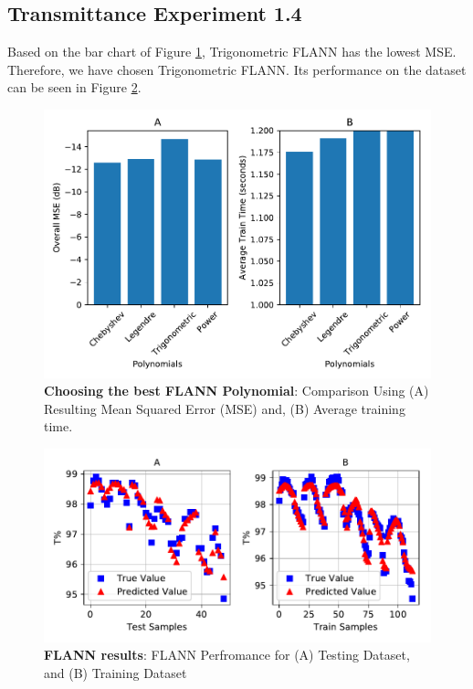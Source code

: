 \documentclass[]{article}
\begin{document}
\newpage

\hypertarget{transmittance-experiment-1.4}{%
\subsection{Transmittance Experiment 1.4}\label{transmittance-experiment-1.4}}

Based on the bar chart of Figure \ref{fig:transflannbar2}, Trigonometric FLANN has the lowest MSE. Therefore, we have chosen Trigonometric FLANN. Its performance on the dataset can be seen in Figure \ref{fig:transmitflannplot2}.


\begin{figure}
\centering
\includegraphics{Report_files/figure-latex/transflannbar2-1.pdf}
\caption{\label{fig:transflannbar2}\textbf{Choosing the best FLANN Polynomial}: Comparison Using (A) Resulting Mean Squared Error (MSE) and, (B) Average training time.}
\end{figure}

\begin{figure}
\centering
\includegraphics{Report_files/figure-latex/transmitflannplot2-1.pdf}
\caption{\label{fig:transmitflannplot2}\textbf{FLANN results}: FLANN Perfromance for (A) Testing Dataset, and (B) Training Dataset}
\end{figure}
\end{document}
